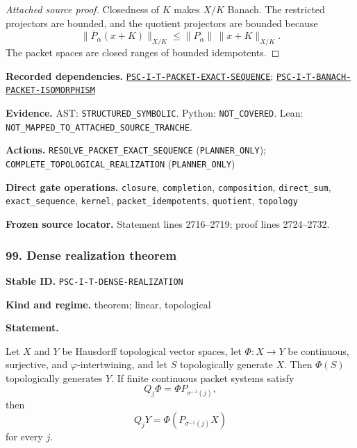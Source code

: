 \documentclass[a4paper,11pt]{article}
\newcommand{\field}[2]{\noindent\textbf{#1.} #2\par}
\begin{document}
\begin{proof}[Attached source proof]
Closedness of $K$ makes $X/K$ Banach.  The restricted projectors are bounded, and the quotient projectors are bounded because
\[
\|\overline P_\alpha(x+K)\|_{X/K}
\leq
\|P_\alpha\|\,\|x+K\|_{X/K}.
\]
The packet spaces are closed ranges of bounded idempotents.
\end{proof}
\field{Recorded dependencies}{\hyperref[rec:PSC-I-T-PACKET-EXACT-SEQUENCE]{\nolinkurl{PSC-I-T-PACKET-EXACT-SEQUENCE}}; \hyperref[rec:PSC-I-T-BANACH-PACKET-ISOMORPHISM]{\nolinkurl{PSC-I-T-BANACH-PACKET-ISOMORPHISM}}}
\field{Evidence}{AST: \nolinkurl{STRUCTURED_SYMBOLIC}. Python: \nolinkurl{NOT_COVERED}. Lean: \nolinkurl{NOT_MAPPED_TO_ATTACHED_SOURCE_TRANCHE}.}
\field{Actions}{\nolinkurl{RESOLVE_PACKET_EXACT_SEQUENCE} (\nolinkurl{PLANNER_ONLY}); \nolinkurl{COMPLETE_TOPOLOGICAL_REALIZATION} (\nolinkurl{PLANNER_ONLY})}
\field{Direct gate operations}{\nolinkurl{closure}, \nolinkurl{completion}, \nolinkurl{composition}, \nolinkurl{direct_sum}, \nolinkurl{exact_sequence}, \nolinkurl{kernel}, \nolinkurl{packet_idempotents}, \nolinkurl{quotient}, \nolinkurl{topology}}
\field{Frozen source locator}{Statement lines 2716--2719; proof lines 2724--2732.}
\subsubsection*{99. Dense realization theorem}
\label{rec:PSC-I-T-DENSE-REALIZATION}
\field{Stable ID}{\nolinkurl{PSC-I-T-DENSE-REALIZATION}}
\field{Kind and regime}{theorem; linear, topological}
\textbf{Statement.}\par
Let $X$ and $Y$ be Hausdorff topological vector spaces, let $\Phi:X\to Y$ be continuous, surjective, and $\varphi$-intertwining, and let $S$ topologically generate $X$.  Then $\Phi(S)$ topologically generates $Y$.  If finite continuous packet systems satisfy
\[
Q_j\Phi=\Phi P_{\sigma^{-1}(j)},
\]
then
\[
\boxed{
Q_jY=\Phi(P_{\sigma^{-1}(j)}X)
}
\]
for every $j$.
\end{document}

